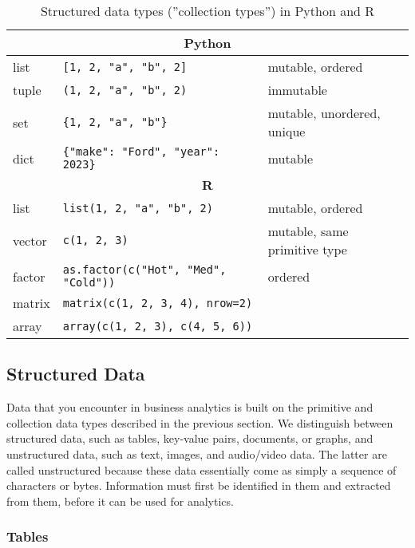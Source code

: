\begin{table}
\renewcommand{\arraystretch}{1.25}
\footnotesize
\centering

\begin{tabular}{l|l|l} \hline
\multicolumn{3}{c}{\textbf{Python}} \\ \hline
list\index{List (in Python)} & \texttt{[1, 2, "a", "b", 2]} & mutable, ordered \\
tuple\index{Tuple (in Python)} & \texttt{(1, 2, "a", "b", 2)} & immutable \\
set\index{Set (in Python)} & \texttt{\{1, 2, "a", "b"\}} &  mutable, unordered, unique \\
dict\index{Dictionary (in Python)} & \texttt{\{"make": "Ford", "year": 2023\}} & mutable \\ \hline
\multicolumn{3}{c}{\textbf{R}} \\ \hline 
list\index{List (in R)} & \texttt{list(1, 2, "a", "b", 2)} & mutable, ordered \\
vector\index{Vector (in R)} & \texttt{c(1, 2, 3)} & mutable, same primitive type \\
factor\index{Factor (in R)} & \texttt{as.factor(c("Hot", "Med", "Cold"))} & ordered\\
matrix\index{Matrix (in R)} & \texttt{matrix(c(1, 2, 3, 4), nrow=2)} & \\
array\index{Array (in R)} & \texttt{array(c(1, 2, 3), c(4, 5, 6))} \\ \hline
\end{tabular}
\caption{Structured data types (''collection types'') in Python and R}
\label{tab:structured}
\end{table}

\FloatBarrier
\subsection{Structured Data}

Data that you encounter in business analytics is built on the primitive and collection data types described in the previous section. We distinguish between structured data, such as tables, key-value pairs, documents, or graphs, and unstructured data, such as text, images, and audio/video data. The latter are called unstructured because these data essentially come as simply a sequence of characters or bytes. Information must first be identified in them and extracted from them, before it can be used for analytics. 

\subsubsection*{Tables}

